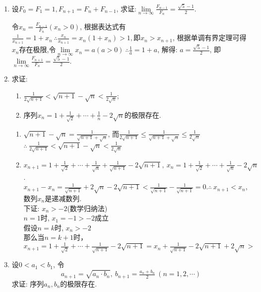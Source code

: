 \begin{enumerate}
\begin{solution}
		
	\end{solution}
	\item 设$F_0=F_1=1,F_{n+1}=F_n+F_{n-1}$, 求证:$\lim\limits_{n\rightarrow \infty}\tfrac{F_{n-1}}{F_n}=\frac{\sqrt{5}-1}{2}$.
	\begin{solution}
		令$x_n=\frac{F_{n-1}}{F_n}(x_n>0)$, 根据表达式有$\frac{1}{x_{n+1}}=1+x_n\ \therefore \frac{x_n}{x_{n+1}}=x_n(1+x_n)>1,\text{即}x_n>x_{n+1}$, 根据单调有界定理可得${x_n}$存在极限,令$\lim\limits_{n \rightarrow \infty}x_n=a(a>0)\ \therefore \frac{1}{a}=1+a$, 解得: $a=\frac{\sqrt{5}-1}{2}$, 即$\lim\limits_{n\rightarrow \infty}\frac{F_{n+1}}{F_n}=\frac{\sqrt{5}-1}{2}$.
	\end{solution}
	\item 求证:
	\begin{enumerate}
		\item $\frac{1}{2\sqrt{n+1}}<\sqrt{n+1}-\sqrt{n}<\frac{1}{2\sqrt{n}}$;
		\item 序列$x_n=1+\frac{1}{\sqrt{2}}+\cdots+\frac{1}{n}-2\sqrt{n}$的极限存在.
	\end{enumerate}
	\begin{solution}
		\begin{enumerate}
			
		 \item 	$\sqrt{n+1}-\sqrt{n}=\frac{1}{\sqrt{n+1}+\sqrt{n}}$, 而$ \frac{1}{2\sqrt{n+1}}\le \frac{1}{\sqrt{n+1}+\sqrt{n}}\le \frac{1}{2\sqrt{n}}$\ 
			$\therefore\ \frac{1}{2\sqrt{n+1}}<\sqrt{n+1}-\sqrt{n}<\frac{1}{2\sqrt{n}}$
		\item $x_{n+1}=1+\frac{1}{\sqrt{2}}+\cdots+\frac{1}{\sqrt{n}}+\frac{1}{\sqrt{n+1}}-2\sqrt{n+1},\ x_n=1+\frac{1}{\sqrt{2}}+\cdots+\frac{1}{\sqrt{n}}-2\sqrt{n}$.\\
		$x_{n+1}-x_n=\frac{1}{\sqrt{n+1}}+2\sqrt{n}-2\sqrt{n+1}<\frac{1}{\sqrt{n+1}}-\frac{1}{\sqrt{n+1}}=0$.$\therefore \ x_{n+1}<x_n$,数列${x_n}$是递减数列.\\
		下证: $x_n>-2$(数学归纳法)\\
		$n=1$时, $x_1=-1>-2$成立\\
		假设$n=k$时, $x_n>-2$\\
		那么当$n=k+1$时，$x_{n+1}=1+\frac{1}{\sqrt{2}}+\cdots+\frac{1}{\sqrt{n+1}}-2\sqrt{n+1}=x_n+\frac{1}{\sqrt{n+1}}-2\sqrt{n+1}+2\sqrt{n}>$
		\end{enumerate}
		
		
	\end{solution}
	\item 设$0<a_1<b_1$, 令
	$$
		a_{n+1} = \sqrt{a_n\cdot b_n},\ b_{n+1}=\tfrac{a_n+b_n}{2}\ (n=1,2,\cdots)
	$$求证: 序列${a_n},{b_n}的极限存在$.
	\begin{solution}
		

\end{solution}
\end{enumerate}

